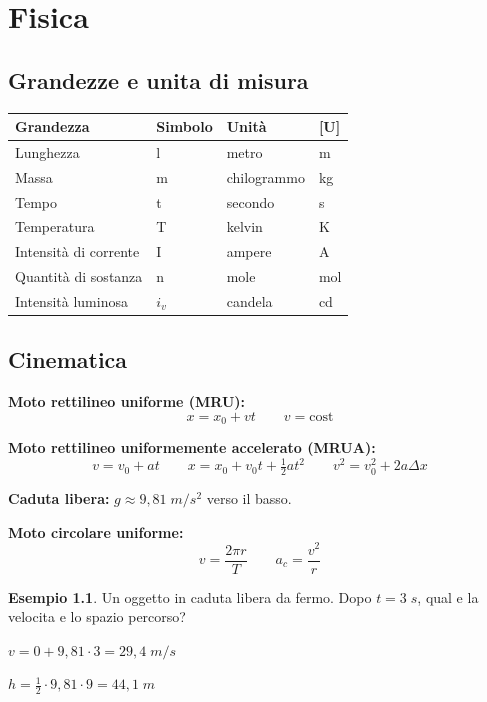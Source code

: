 \documentclass[12pt, a4paper, twoside, openright]{book}
\theoremstyle{definition}
\newtheorem{esempio}{Esempio}[section]
\begin{document}
\chapter{Fisica}

\section{Grandezze e unita di misura}

\begin{defbox}
\begin{center}
\begin{tabular}{llll}
\toprule
\textbf{Grandezza} & \textbf{Simbolo} & \textbf{Unità} & \textbf{[U]} \\
\midrule
Lunghezza & l & metro & m \\
Massa & m & chilogrammo & kg \\
Tempo & t & secondo & s \\
Temperatura & T & kelvin & K \\
Intensità di corrente & I & ampere & A \\
Quantità di sostanza & n & mole & mol \\
Intensità luminosa & $i_v$ & candela & cd \\
\bottomrule
\end{tabular}
\end{center}
\end{defbox}

\section{Cinematica}

\begin{formulario}
\textbf{Moto rettilineo uniforme (MRU):}
\[
x = x_0 + v t \qquad v = \text{cost}
\]

\textbf{Moto rettilineo uniformemente accelerato (MRUA):}
\[
v = v_0 + at \qquad
x = x_0 + v_0 t + \tfrac{1}{2}at^2 \qquad
v^2 = v_0^2 + 2a\Delta x
\]

\textbf{Caduta libera:} $g \approx 9{,}81\;\si{m/s^2}$ verso il basso.

\textbf{Moto circolare uniforme:}
\[
v = \frac{2\pi r}{T} \qquad a_c = \frac{v^2}{r}
\]
\end{formulario}

\begin{esempio}
Un oggetto in caduta libera da fermo. Dopo $t = 3\;\si{s}$, qual e la velocita e lo spazio percorso?

$v = 0 + 9{,}81 \cdot 3 = 29{,}4\;\si{m/s}$

$h = \tfrac{1}{2} \cdot 9{,}81 \cdot 9 = 44{,}1\;\si{m}$
\end{esempio}
\end{document}
